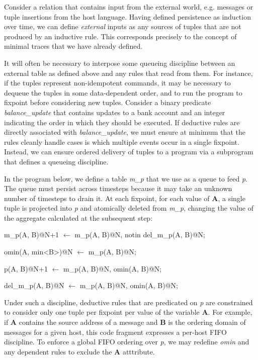 Consider a relation that contains input from the external world, e.g. messages or tuple insertions from the host language.  
Having defined persistence as induction over time, we can define \emph{external} inputs as any sources of tuples 
that are not produced by an inductive rule.  This corresponds precisely to the concept of minimal traces that we have already
defined.

It will often be necessary to interpose some queueing discipline between an external table as defined above and any
rules that read from them.  For instance, if the tuples represent non-idempotent commands, it may be necessary to dequeue
the tuples in some data-dependent order, and to run the program to fixpoint before considering new tuples.  Consider a binary
predicate \emph{balance\_update} that contains updates to a bank account and an integer indicating the order in which they
should be executed.  If deductive rules are directly associated with \emph{balance\_update}, we must ensure at minimum that
the rules cleanly handle cases is which multiple events occur in a single fixpoint.  Instead, we can ensure ordered delivery 
of tuples to a program via a subprogram that defines a queueing discipline.

In the program below, we define a table \emph{m\_p} that we use as a queue to feed \emph{p}.  The queue must persist across
timesteps because it may take an unknown number of timesteps to drain it.  At each fixpoint, for each value of \textbf{A}, a single
tuple is projected into \emph{p} and atomically deleted from \emph{m\_p}, changing the value of the aggregate calculated at the
subsequent step:


\begin{Dedalus}
m\_p(A, B)@N+1 \(\leftarrow\)
  m\_p(A, B)@N,
  notin del\_m\_p(A, B)@N;

omin(A, min<B>)@N \(\leftarrow\)
  m\_p(A, B)@N;

p(A, B)@N+1 \(\leftarrow\)
  m\_p(A, B)@N,
  omin(A, B)@N;

del\_m\_p(A, B)@N \(\leftarrow\)
  m\_p(A, B)@N,
  omin(A, B)@N;
\end{Dedalus}

Under such a discipline, deductive rules that are predicated on \emph{p} are constrained to consider only one tuple per fixpoint
per value of the variable \textbf{A}.  For example, if \textbf{A} contains the source address of a message and \textbf{B} is the ordering
domain of messages for a given host, this code fragment
expresses a per-host FIFO discipline.  To enforce a global FIFO ordering over \emph{p}, we may redefine \emph{omin} and any 
dependent rules to exclude the \textbf{A} atttribute.

